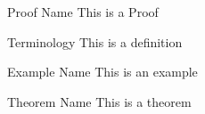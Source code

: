 


\maketitle
\tableofcontents
\newpage

\begin{prf}{Proof Name}{}
	This is a Proof
\end{prf}

\begin{df}{Terminology}{}
	This is a definition
\end{df}

\begin{eg}{Example Name}{}
	This is an example
\end{eg}

\begin{thm}{Theorem Name}{}
	This is a theorem
\end{thm}
	

